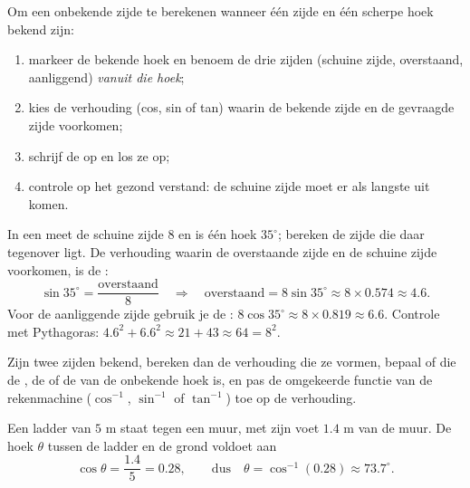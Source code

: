 \begin{method}\label{met:g9:trig:side}
Om een onbekende zijde te berekenen wanneer één zijde en één scherpe hoek bekend
zijn:
\begin{enumerate}
  \item markeer de bekende hoek en benoem de drie zijden (schuine zijde,
        overstaand, aanliggend) \emph{vanuit die hoek};
  \item kies de verhouding (cos, sin of tan) waarin de bekende zijde en de
        gevraagde zijde voorkomen;
  \item schrijf de  op en los ze op;
  \item controle op het gezond verstand: de schuine zijde moet er als langste uit
        komen.
\end{enumerate}
\end{method}

\begin{example}\label{ex:g9:trig:side}
In een  meet de schuine zijde $8$ en is één hoek $35^\circ$;
bereken de zijde die daar tegenover ligt. De verhouding waarin de overstaande zijde
en de schuine zijde voorkomen, is de :
\[
\sin 35^\circ = \frac{\text{overstaand}}{8}
\quad\Longrightarrow\quad
\text{overstaand} = 8 \sin 35^\circ \approx 8 \times 0.574 \approx 4.6 .
\]
Voor de aanliggende zijde gebruik je de :
$8\cos 35^\circ \approx 8 \times 0.819 \approx 6.6$. Controle met Pythagoras:
$4.6^2 + 6.6^2 \approx 21 + 43 \approx 64 = 8^2$.
\end{example}

\begin{method}\label{met:g9:trig:angle}
Zijn twee zijden bekend, bereken dan de verhouding die ze vormen, bepaal of die de
, de  of de  van de onbekende hoek is, en pas de omgekeerde
functie van de rekenmachine ($\cos^{-1}$, $\sin^{-1}$ of $\tan^{-1}$) toe op de
verhouding.
\end{method}

\begin{example}\label{ex:g9:trig:angle}
Een ladder van $5$ m staat tegen een muur, met zijn voet $1.4$ m van de muur. De
hoek $\theta$ tussen de ladder en de grond voldoet aan
\[
\cos\theta = \frac{1.4}{5} = 0.28,
\qquad\text{dus}\quad
\theta = \cos^{-1}(0.28) \approx 73.7^\circ .
\]
\end{example}

